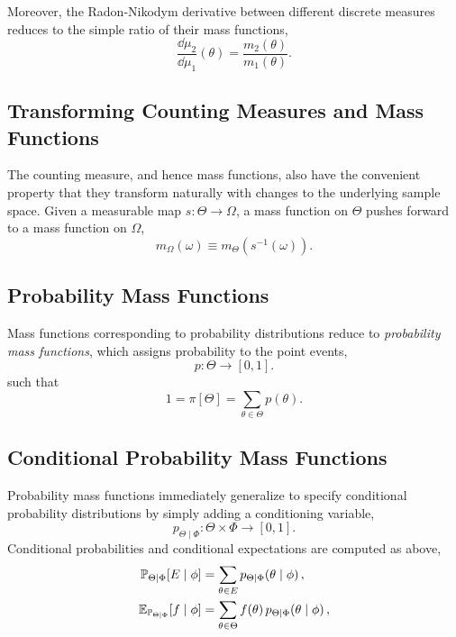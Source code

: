 Moreover, the Radon-Nikodym derivative between different discrete 
measures reduces to the simple ratio of their mass functions,
%
\begin{equation*}
\frac{ \dd \mu_{2} }{ \dd \mu_{1} } \! \left( \theta \right)
=
\frac{ m_{2} \! \left( \theta \right) }{ m_{1} \! \left( \theta \right) }.
\end{equation*}

\subsection{Transforming Counting Measures and Mass Functions}

The counting measure, and hence mass functions, also have the
convenient property that they transform naturally with changes to
the underlying sample space.  Given a measurable map 
$s : \Theta \rightarrow \Omega$, a mass function on $\Theta$
pushes forward to a mass function on $\Omega$,
%
\begin{equation*}
m_{\Omega} \! \left( \omega \right) 
\equiv 
m_{\Theta} \! \left( s^{-1} \! \left( \omega \right) \right).
\end{equation*}

\subsection{Probability Mass Functions}

Mass functions corresponding to probability distributions reduce
to \emph{probability mass functions}, which assigns probability to the
point events,
%
\begin{equation*}
p : \Theta \rightarrow \left[0, 1\right].
\end{equation*}
%
such that
%
\begin{equation*}
1 = \pi \! \left[ \Theta \right] = \sum_{\theta \in \Theta} p \! \left( \theta \right).
\end{equation*}

\subsection{Conditional Probability Mass Functions}

Probability mass functions immediately generalize to specify conditional 
probability distributions by simply adding a conditioning variable,
%
\begin{equation*}
p_{\Theta \mid \Phi} : \Theta \times \Phi \rightarrow \left[0, 1\right].
\end{equation*}
%
Conditional probabilities and conditional expectations are computed
as above,
%
\begin{align*}
\mathbb{P}_{\Theta \mid \Phi}  \! \left[ E \mid \phi \right]
&=
\sum_{\theta \in E} p_{\Theta \mid \Phi}  \! \left( \theta \mid \phi \right),
\\
\mathbb{E}_{\mathbb{P}_{\Theta \mid \Phi} } \! \left[ f \mid \phi \right]
&=
\sum_{\theta \in \Theta} f \! \left( \theta \right) 
p_{\Theta \mid \Phi}  \! \left( \theta \mid \phi \right),
\end{align*}

